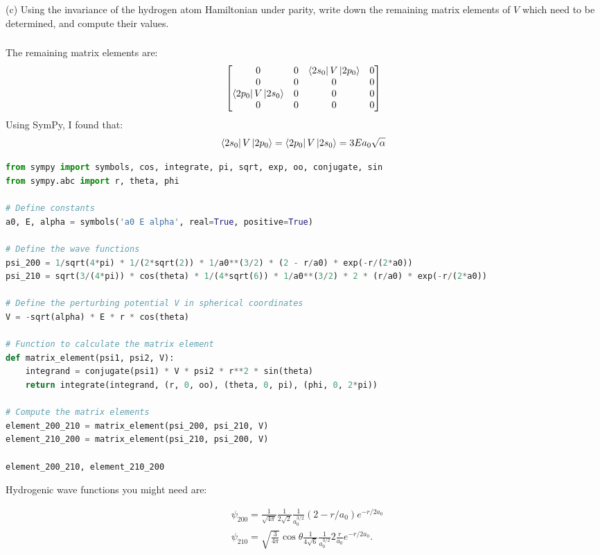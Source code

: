 \documentclass[12pt]{article}
\begin{document}
(c) Using the invariance of the hydrogen atom Hamiltonian under parity, write down the remaining matrix elements of $V$ which need to be determined, and compute their values.
\subsubsection{}
The remaining matrix elements are:
\begin{equation}
  \begin{bmatrix}
    0 & 0 & \bra{2s_{0}}V\ket{2p_{0}} & 0 \\
    0 & 0 & 0 & 0 \\
    \bra{2p_{0}}V\ket{2s_{0}} & 0 & 0 & 0 \\
    0 & 0 & 0 & 0
  \end{bmatrix}
\end{equation}
Using SymPy, I found that:
\begin{equation}
  \bra{2s_{0}}V\ket{2p_{0}} = \bra{2p_{0}}V\ket{2s_{0}} = 3Ea_0 \sqrt{\alpha }
\end{equation}
\begin{lstlisting}[language=Python]
from sympy import symbols, cos, integrate, pi, sqrt, exp, oo, conjugate, sin
from sympy.abc import r, theta, phi

# Define constants
a0, E, alpha = symbols('a0 E alpha', real=True, positive=True)

# Define the wave functions
psi_200 = 1/sqrt(4*pi) * 1/(2*sqrt(2)) * 1/a0**(3/2) * (2 - r/a0) * exp(-r/(2*a0))
psi_210 = sqrt(3/(4*pi)) * cos(theta) * 1/(4*sqrt(6)) * 1/a0**(3/2) * 2 * (r/a0) * exp(-r/(2*a0))

# Define the perturbing potential V in spherical coordinates
V = -sqrt(alpha) * E * r * cos(theta)

# Function to calculate the matrix element
def matrix_element(psi1, psi2, V):
    integrand = conjugate(psi1) * V * psi2 * r**2 * sin(theta)
    return integrate(integrand, (r, 0, oo), (theta, 0, pi), (phi, 0, 2*pi))

# Compute the matrix elements
element_200_210 = matrix_element(psi_200, psi_210, V)
element_210_200 = matrix_element(psi_210, psi_200, V)

element_200_210, element_210_200


\end{lstlisting}

Hydrogenic wave functions you might need are:

$$
\begin{aligned}
& \psi_{200}=\frac{1}{\sqrt{4 \pi}} \frac{1}{2 \sqrt{2}} \frac{1}{a_{0}^{3 / 2}}\left(2-r / a_{0}\right) e^{-r / 2 a_{0}} \\
& \psi_{210}=\sqrt{\frac{3}{4 \pi}} \cos \theta \frac{1}{4 \sqrt{6}} \frac{1}{a_{0}^{3 / 2}} 2 \frac{r}{a_{0}} e^{-r / 2 a_{0}} .
\end{aligned}
$$
\end{document}
